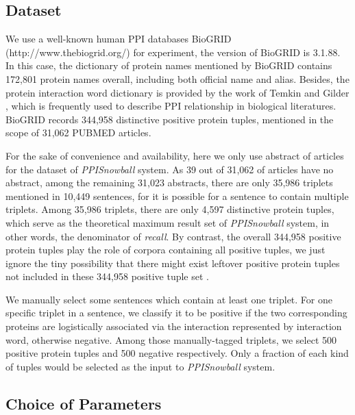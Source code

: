 \subsection{Dataset}
\label{exp:Dataset}

We use a well-known human PPI databases BioGRID\cite{DBLP:journals/nar/StarkBRBBT06} (http://www.thebiogrid.org/) for experiment, the version of BioGRID is 3.1.88. In this case, the dictionary of protein names mentioned by BioGRID contains 172,801 protein names overall, including both official name and alias. Besides, the protein interaction word dictionary is provided by the work of Temkin and Gilder \cite{Temkin03Interactionword}, which is frequently used to describe PPI relationship in biological literatures. BioGRID records 344,958 distinctive positive protein tuples, mentioned in the scope of 31,062 PUBMED articles.

For the sake of convenience and availability, here we only use abstract of articles for the dataset of \emph{PPISnowball} system. As 39 out of 31,062 of articles have no abstract, among the remaining 31,023 abstracts, there are only 35,986 triplets mentioned in 10,449 sentences, for it is possible for a sentence to contain multiple triplets. Among 35,986 triplets, there are only 4,597 distinctive protein tuples, which serve as the theoretical maximum result set of \emph{PPISnowball} system, in other words, the denominator of \emph{recall}. By contrast, the overall 344,958 positive protein tuples play the role of corpora containing all positive tuples, we just ignore the tiny possibility that there might exist leftover positive protein tuples not included in these 344,958 positive tuple set \cite{DBLP:journals/bioinformatics/ChowdharyZL09}.

We manually select some sentences which contain at least one triplet. For one specific triplet in a sentence, we classify it to be positive if the two corresponding proteins are logistically associated via the interaction represented by interaction word, otherwise negative. Among those manually-tagged triplets, we select 500 positive protein tuples and 500 negative respectively. Only a fraction of each kind of tuples would be selected as the input to \emph{PPISnowball} system.

\subsection{Choice of Parameters}
\label{exp:param}


